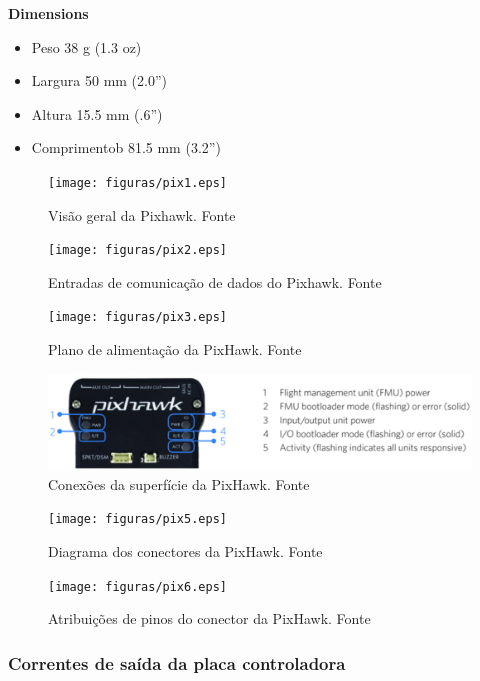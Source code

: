 \textbf{Dimensions}
\begin{itemize}
\item Peso 38 g (1.3 oz)
\item Largura 50 mm (2.0”)
\item Altura 15.5 mm (.6”)
\item Comprimentob 81.5 mm (3.2”)
\end{itemize}

\begin{figure}[H]
	\centering
	  \texttt{[image: figuras/pix1.eps]}
	\caption{Visão geral da Pixhawk. Fonte \cite{pixhawk}}
	\label{fig:pix1}
\end{figure}

\begin{figure}[H]
	\centering
	  \texttt{[image: figuras/pix2.eps]}
	\caption{Entradas  de comunicação de dados  do Pixhawk. Fonte \cite{pixhawk}}
	\label{fig:pix2}
\end{figure}

\begin{figure}[H]
	\centering
	  \texttt{[image: figuras/pix3.eps]}
	\caption{Plano de alimentação da PixHawk. Fonte \cite{pixhawk}}
	\label{fig:pix3}
\end{figure}

\begin{figure}[H]
	\centering
	  \includegraphics[keepaspectratio=true,scale=0.6]{figuras/pix4.eps}
	\caption{Conexões da superfície da PixHawk. Fonte \cite{pixhawk}}
	\label{fig:pix4}
\end{figure}

\begin{figure}[H]
	\centering
	  \texttt{[image: figuras/pix5.eps]}
	\caption{Diagrama dos conectores da PixHawk. Fonte \cite{pixhawk}}
	\label{fig:pix5}
\end{figure}

\begin{figure}[H]
	\centering
	  \texttt{[image: figuras/pix6.eps]}
	\caption{Atribuições de pinos do conector da PixHawk. Fonte \cite{pixhawk}}
	\label{fig:pix6}
\end{figure}

\subsubsection{Correntes de saída da placa controladora}



